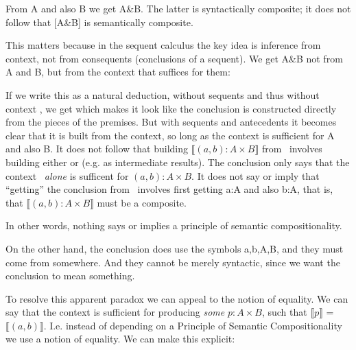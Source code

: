 \documentclass{article}
\begin{document}
From A and also B we get A\&B. The latter is syntactically composite;
it does not follow that [A\&B] is semantically composite.

This matters because in the sequent calculus the key idea is inference
from context, not from consequents (conclusions of a sequent). We get
A\&B not from A and B, but from the context that suffices for them:



If we write this as a natural deduction, without sequents and thus
without context \ContextG , we get
which
makes it look like the conclusion is constructed directly from the
pieces of the premises. But with sequents and antecedents it becomes
clear that it is built from the context, so long as the context is
sufficient for A and also B. It does not follow that building
\(\llbracket (a,b):A\times B\rrbracket\) from \ContextG\ involves
building either  or  (e.g. as intermediate
results). The conclusion only says that the context
\ContextG\ \textit{alone} is sufficent for \((a,b):A\times B\). It
does not say or imply that ``getting'' the conclusion from
\ContextG\ involves first getting a:A and also b:A, that is, that
\(\llbracket (a,b):A\times B\rrbracket\) must be a composite.

In other words, nothing says or implies a principle of semantic
compositionality.

On the other hand, the conclusion does use the symbols a,b,A,B, and
they must come from somewhere. And they cannot be merely syntactic,
since we want the conclusion to mean something.

To resolve this apparent paradox we can appeal to the notion of
equality. We can say that the context is sufficient for producing
\textit{some} \(p:A\times B\), such that \(\llbracket p\rrbracket\) =
\(\llbracket(a,b)\rrbracket\). I.e. instead of depending on a
Principle of Semantic Compositionality we use a notion of equality. We
can make this explicit:

\end{document}
